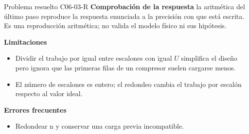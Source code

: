 \documentclass[10pt,openany]{book}
\begin{document}
\begin{studiumworked}{Problema resuelto C06-03-R}
\noindent\textbf{Comprobación de la respuesta} la aritmética del último paso reproduce la respuesta enunciada a la precisión con que está escrita. Es una reproducción aritmética; no valida el modelo físico ni sus hipótesis.

\noindent\textbf{Limitaciones}
\begin{itemize}
\item Dividir el trabajo por igual entre escalones con igual $U$ simplifica el diseño pero ignora que las primeras filas de un compresor suelen cargarse menos.
\item El número de escalones es entero; el redondeo cambia el trabajo por escalón respecto al valor ideal.
\end{itemize}

\noindent\textbf{Errores frecuentes}
\begin{itemize}
\item Redondear n y conservar una carga previa incompatible.
\end{itemize}
\end{studiumworked}
\end{document}
